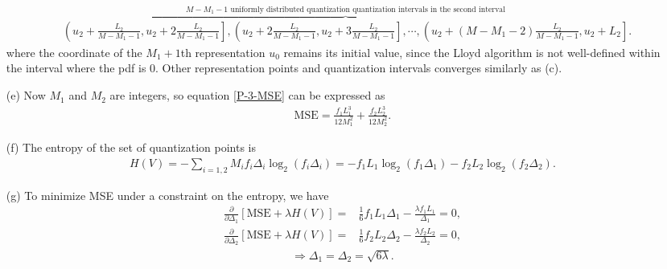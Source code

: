 \documentclass{assignment}
\begin{document}
\begin{sol}
\begin{itemize}
{\begin{align*}
            &\overbrace{\left(u_2+\frac{L_2}{M-M_1-1},u_2+2\frac{L_2}{M-M_1-1}\right],\left(u_2+2\frac{L_2}{M-M_1-1},u_2+3\frac{L_2}{M-M_1-1}\right],\cdots,\left(u_2+(M-M_1-2)\frac{L_2}{M-M_1-1},u_2+L_2\right]}^{M-M_1-1\text{ uniformly distributed quantization quantization intervals in the second interval}}.
        \end{align*}
        }%
        where the coordinate of the $M_1+1$th representation $u_0$ remains its initial value, since the Lloyd algorithm is not well-defined within the interval where the pdf is $0$. Other representation points and quantization intervals converges similarly as (c).
        \item[(e)] Now $M_1$ and $M_2$ are integers, so equation \ref{P-3-MSE} can be expressed as
        \begin{align}
            \text{MSE}=\frac{f_1L_1^3}{12M_1^2}+\frac{f_2L_2^3}{12M_2^2}.
        \end{align}
        \item[(f)] The entropy of the set of quantization points is
        \begin{align}
            H(V)=-\sum_{i=1,2}M_if_i\Delta_i\log_2(f_i\Delta_i)=-f_1L_1\log_2(f_1\Delta_1)-f_2L_2\log_2(f_2\Delta_2).
        \end{align}
        \item[(g)] To minimize MSE under a constraint on the entropy, we have
        \begin{align}
            \frac{\partial}{\partial\Delta_1}[\text{MSE}+\lambda H(V)]=&\frac{1}{6}f_1L_1\Delta_1-\frac{\lambda f_1L_1}{\Delta_1}=0,\\
            \frac{\partial}{\partial\Delta_2}[\text{MSE}+\lambda H(V)]=&\frac{1}{6}f_2L_2\Delta_2-\frac{\lambda f_2L_2}{\Delta_2}=0,
        \end{align}
        \begin{align}
            \Longrightarrow\Delta_1=\Delta_2=\sqrt{6\lambda}.
        \end{align}
    \end{itemize}
\end{sol}
\end{document}
